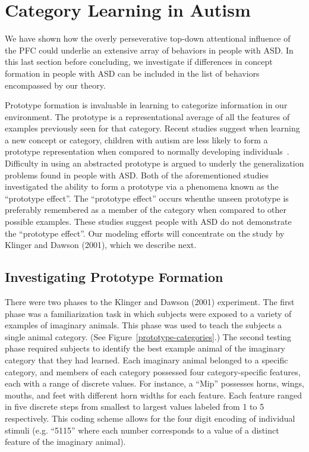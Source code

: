 %
%

\section{Category Learning in Autism}
We have shown how the overly perseverative top-down attentional influence of the PFC could underlie an extensive array of behaviors in people with ASD.  In this last section before concluding, we investigate if differences in concept formation in people with ASD can be included in the list of behaviors encompassed by our theory.  

Prototype formation is invaluable in learning to categorize information in our environment.  The prototype is a representational average of all the features of examples previously seen for that category. Recent studies suggest when learning a new concept or category, children with autism are less likely to form a prototype representation when compared to normally developing individuals~\cite{RefWorks:113,StraussMS:2009:Prototype}.  Difficulty in using an abstracted prototype is argued to underly the generalization problems found in people with ASD.  Both of the aforementioned studies investigated the ability to form a prototype via a phenomena known as the ``prototype effect''.  The ``prototype effect'' occurs whenthe unseen prototype is preferably remembered as a member of the category when compared to other possible examples.  These studies suggest people with ASD do not demonstrate the ``prototype effect''.  Our modeling efforts will concentrate on the study by Klinger and Dawson (2001), which we describe next. 

\subsection{Investigating Prototype Formation}
There were two phases to the Klinger and Dawson (2001) experiment.  The first phase was a familiarization task in which subjects were exposed to a variety of examples of imaginary animals.  This phase was used to teach the subjects a single animal category. (See Figure~\ref{prototype-categories}.) The second testing phase required subjects to identify the best example animal of the imaginary category that they had learned.   Each imaginary animal belonged to a specific category, and members of each category possessed four category-specific features, each with a range of discrete values.  For instance, a ``Mip'' possesses horns, wings, mouths, and feet with different horn widths for each feature.  Each feature ranged in five discrete steps from smallest to largest values labeled from 1 to 5 respectively. This coding scheme allows for the four digit encoding of individual stimuli (e.g. ``5115'' where each number corresponds to a value of a distinct feature of the imaginary animal). 

